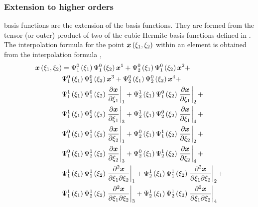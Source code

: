 \subsubsection{Extension to higher orders}

\Bicubicherm basis functions are the \twodal extension of the \onedal
\cubicherm basis functions. They are formed from the tensor (or outer) product
of two of the \onedal cubic Hermite basis functions defined in
.  The interpolation formula for the point
$\fnof{\vect{x}}{\xione,\xitwo}$ within an element is obtained from the
\bicubicherm interpolation formula \cite{nielsen:1991a}, 
\begin{equation}
  \begin{split}
    \fnof{\vect{x}}{\xione,\xitwo} &=
    \chbfn{1}{0}{\xione}\chbfn{1}{0}{\xitwo}\nodept{\vect{x}}{1} +
    \chbfn{2}{0}{\xione}\chbfn{1}{0}{\xitwo}\nodept{\vect{x}}{2} + \\
    & \chbfn{1}{0}{\xione}\chbfn{2}{0}{\xitwo}\nodept{\vect{x}}{3} +
    \chbfn{2}{0}{\xione}\chbfn{2}{0}{\xitwo}\nodept{\vect{x}}{4} + \\
    & \chbfn{1}{1}{\xione}\chbfn{1}{0}{\xitwo}\evalat{\delby{\vect{x}}{\xione}}
    {1}+
    \chbfn{2}{1}{\xione}\chbfn{1}{0}{\xitwo}\evalat{\delby{\vect{x}}{\xione}}
    {2}+ \\ 
    & \chbfn{1}{1}{\xione}\chbfn{2}{0}{\xitwo}\evalat{\delby{\vect{x}}{\xione}}
    {3}+
    \chbfn{2}{1}{\xione}\chbfn{2}{0}{\xitwo}\evalat{\delby{\vect{x}}{\xione}}
    {4} + \\ 
    & \chbfn{1}{0}{\xione}\chbfn{1}{1}{\xitwo}\evalat{\delby{\vect{x}}{\xitwo}}
    {1}+
    \chbfn{2}{0}{\xione}\chbfn{1}{1}{\xitwo}\evalat{\delby{\vect{x}}{\xitwo}}
    {2} + \\ 
    & \chbfn{1}{0}{\xione}\chbfn{2}{1}{\xitwo}\evalat{\delby{\vect{x}}{\xitwo}}
    {3}+
    \chbfn{2}{0}{\xione}\chbfn{2}{1}{\xitwo}\evalat{\delby{\vect{x}}{\xitwo}}
    {4} + \\ 
    & \chbfn{1}{1}{\xione}\chbfn{1}{1}{\xitwo}\evalat{\deltwoby{\vect{x}}
      {\xione}{\xitwo}}{1} +
    \chbfn{2}{1}{\xione}\chbfn{1}{1}{\xitwo}\evalat{\deltwoby{\vect{x}}
      {\xione}{\xitwo}}{2} + \\
    & \chbfn{1}{1}{\xione}\chbfn{2}{1}{\xitwo}\evalat{\deltwoby{\vect{x}}
      {\xione}{\xitwo}}{3} + 
    \chbfn{2}{1}{\xione}\chbfn{2}{1}{\xitwo}\evalat{ \deltwoby{\vect{x}}
      {\xione}{\xitwo}}{4}    
  \end{split}
  \label{eqn:bichxiinterp}
\end{equation}

